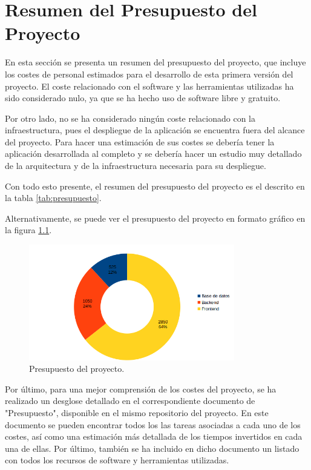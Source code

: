 \chapter{Resumen del Presupuesto del Proyecto}
\label{ch:presupuesto}

En esta sección se presenta un resumen del presupuesto del proyecto, que incluye los costes de personal estimados para el desarrollo de esta primera versión del proyecto. El coste relacionado con el software y las herramientas utilizadas ha sido considerado nulo, ya que se ha hecho uso de software libre y gratuito.

Por otro lado, no se ha considerado ningún coste relacionado con la infraestructura, pues el despliegue de la aplicación se encuentra fuera del alcance del proyecto. Para hacer una estimación de sus costes se debería tener la aplicación desarrollada al completo y se debería hacer un estudio muy detallado de la arquitectura y de la infraestructura necesaria para su despliegue.

Con todo esto presente, el resumen del presupuesto del proyecto es el descrito en la tabla \ref{tab:presupuesto}.

\renewcommand{\arraystretch}{1.5}



Alternativamente, se puede ver el presupuesto del proyecto en formato gráfico en la figura \ref{fig:presupuesto}.

\begin{figure}[H]
    \centering
    \includegraphics[width=0.8\textwidth]{figures/presupuesto/plot.png}
    \caption{Presupuesto del proyecto.}
    \label{fig:presupuesto}
\end{figure}

Por último, para una mejor comprensión de los costes del proyecto, se ha realizado un desglose detallado en el correspondiente documento de "Presupuesto", disponible en el mismo repositorio del proyecto. En este documento se pueden encontrar todos los las tareas asociadas a cada uno de los costes, así como una estimación más detallada de los tiempos invertidos en cada una de ellas. Por último, también se ha incluido en dicho documento un listado con todos los recursos de software y herramientas utilizadas.